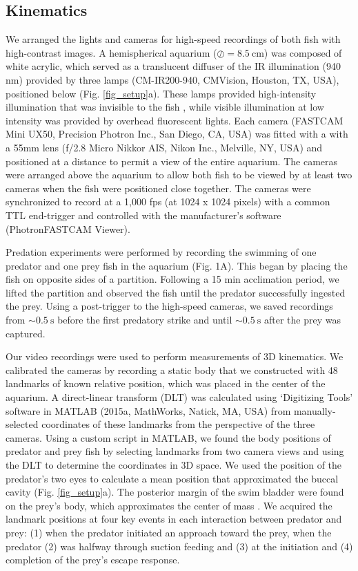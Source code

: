 \documentclass[]{rsos}%
\begin{document}
\subsection{Kinematics}
We arranged the lights and cameras for high-speed recordings of both fish with high-contrast images. 
A hemispherical aquarium ($\oslash = \SI{8.5}{\cm}$) was composed of white acrylic, which served as a translucent diffuser of the IR illumination (940 nm) provided by three lamps (CM-IR200-940, CMVision, Houston, TX, USA), positioned below (Fig. \ref{fig_setup}a). 
These lamps provided high-intensity illumination that was invisible to the fish \cite{Robinson:1993tu}, while visible illumination at low intensity was provided by overhead fluorescent lights.
Each camera (FASTCAM Mini UX50, Precision Photron Inc., San Diego, CA, USA) was fitted with a with a 55mm lens (f/2.8 Micro Nikkor AIS, Nikon Inc., Melville, NY, USA) and positioned at a distance to permit a view of the entire aquarium. 
The cameras were arranged above the aquarium to allow both fish to be viewed by at least two cameras when the fish were positioned close together.
The cameras were synchronized to record at a 1,000 fps (at 1024 x 1024 pixels) with a common TTL end-trigger and controlled with the manufacturer's software (PhotronFASTCAM Viewer).

Predation experiments were performed by recording the swimming of one predator and one prey fish in the aquarium (Fig. 1A). 
This began by placing the fish on opposite sides of a partition.
Following a 15 min acclimation period, we lifted the partition and observed the fish until the predator successfully ingested the prey.
Using a post-trigger to the high-speed cameras, we saved recordings from $\sim \SI{0.5}{\s}$ before the first predatory strike and until $\sim \SI{0.5}{\s}$  after the prey was captured.

Our video recordings were used to perform measurements of 3D kinematics. 
We calibrated the cameras by recording a static body that we constructed with 48 landmarks of known relative position, which was placed in the center of the aquarium.
A direct-linear transform (DLT) was calculated using `Digitizing Tools' software in MATLAB (2015a, MathWorks, Natick, MA, USA) \cite{Hedrick:2008wz} from manually-selected coordinates of these landmarks from the perspective of the three cameras.
Using a custom script in MATLAB, we found the body positions of predator and prey fish by selecting landmarks from two camera views and using the DLT to determine the coordinates in 3D space.
We used the position of the predator's two eyes to calculate a mean position that approximated the buccal cavity (Fig. \ref{fig_setup}a).
The posterior margin of the swim bladder were found on the prey's body, which approximates the center of mass \cite{Stewart:2010ig}.
We acquired the landmark positions at four key events in each interaction between predator and prey: (1) when the predator initiated an approach toward the prey, when the predator (2)  was halfway through suction feeding and (3) at the initiation and (4) completion of the prey's escape response.
\end{document}
